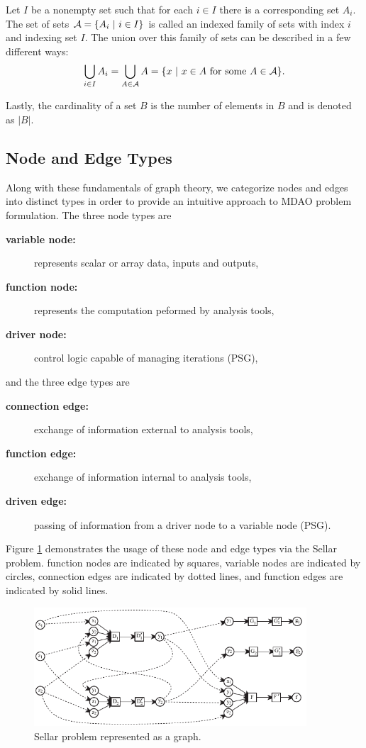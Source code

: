   Let $I$ be a nonempty set such that for each $i \in I$ there is a corresponding set $A_i$. 
  The set of sets $\mathcal A = \{A_i \ | \  i \in I\}$ is called an indexed family of sets with index $i$ and 
  indexing set $I$\cite{smith2006}. 
  The union over this family of sets can be described in a few different ways:
  \begin{equation}
  \bigcup_{i \in I} A_i = \bigcup_{A \in \mathcal A} A = \{x \ | \  x \in A \textrm{ for some } A \in \mathcal A\}.
  \end{equation}

  Lastly, the cardinality of a set $B$ is the number of elements in $B$ and is denoted as $|B|$.

\subsection{Node and Edge Types}
  \label{ss:types}
Along with these fundamentals of graph theory, we categorize nodes and edges into distinct types in order to provide an intuitive approach to MDAO problem formulation. The three node types are
  \begin{description}
    \item[\bf{variable node:}] represents scalar or array data, inputs and outputs,
    \item[\bf{function node:}] represents the computation peformed by analysis tools,
    \item[\bf{driver node:}] control logic capable of managing iterations (PSG),
  \end{description}
and the three edge types are

  \begin{description}
  \item[\bf{connection edge:}] exchange of information external to analysis tools,
  \item[\bf{function edge:}] exchange of information internal to analysis tools,
  \item[\bf{driven edge:}] passing of information from a driver node to a variable node (PSG).
  \end{description}
Figure \ref{f:sellar types} demonstrates the usage of these node and edge types via the Sellar problem. function nodes are indicated by squares, variable nodes are indicated by circles, connection edges are indicated by dotted lines, and function edges are indicated by solid lines.
\begin{figure}[htb!]
  \begin{center}
    \includegraphics[width=4.0in]{images/sellar_types}
  \end{center}
  \caption{Sellar problem represented as a graph.}
\label{f:sellar types}
\end{figure} 

